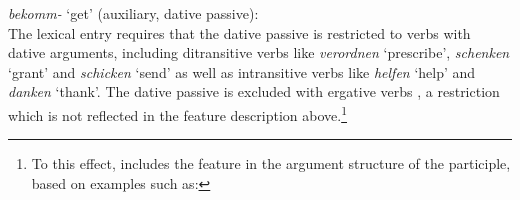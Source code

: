 \documentclass[output=paper
                ,modfonts
                ,nonflat
	        ,collection
	        ,collectionchapter
	        ,collectiontoclongg
 	        ,biblatex
                ,babelshorthands
                ,newtxmath
                ,draftmode
                ,colorlinks, citecolor=brown
]{./langsci/langscibook}
\begin{document}
\ea \label{get2}
\textit{bekomm-} `get' (auxiliary, dative passive): \\
\z 
The lexical entry requires that the dative passive is restricted to verbs with dative arguments, including ditransitive verbs like \textit{verordnen} `prescribe', \textit{schenken} `grant' and \textit{schicken} `send' as well as intransitive verbs like \textit{helfen} `help' and \textit{danken} `thank'. The dative passive is excluded with ergative verbs \citep[298]{mueller2013}, a restriction which is not reflected in the feature description above.\footnote{To this effect, \cite[298, 313]{mueller2013} includes the feature \da in the argument structure of the participle, based on examples such as:
\z
}
\end{document}
